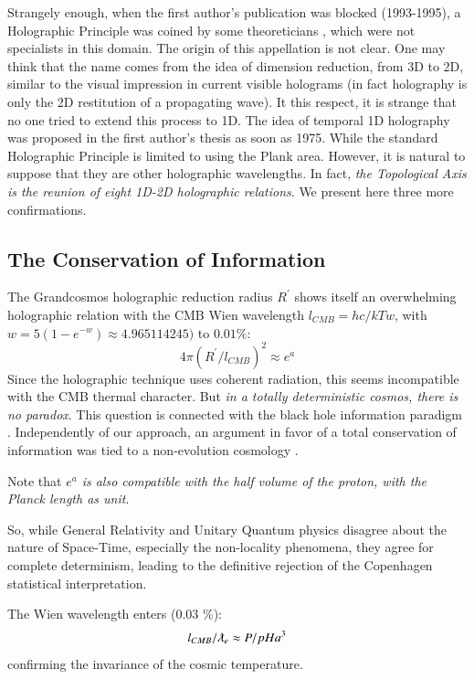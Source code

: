 \documentclass[twoside,draft]{article}
\begin{document}
\begin{sloppypar}
Strangely enough, when the first author's publication was blocked (1993-1995), a Holographic Principle was coined by some theoreticians \cite{Bousso}, which were not specialists in this domain. The origin of this appellation is not clear. One may think that the name comes from the idea of dimension reduction, from 3D to 2D, similar to the visual impression in current visible holograms (in fact holography is only the 2D restitution of a propagating wave). It this respect, it is strange that no one tried to extend this process to 1D. The idea of temporal 1D holography was proposed in the first author's thesis as soon as 1975. While the standard Holographic Principle is limited to using the Plank area. However, it is natural to suppose that they are other holographic wavelengths. In fact, \textit{the Topological Axis is the reunion of eight 1D-2D holographic relations}. We present here three more confirmations. 

\subsection{The Conservation of Information}

The Grandcosmos holographic reduction radius $R^{\prime}$ shows itself an overwhelming holographic
relation with the CMB Wien wavelength $l_{CMB} = hc/kTw $, with $w = 5 (1-e^{-w}) \approx 4.965114245)$ to $0.01\%$:
\begin{equation}
4\pi(R^{\prime}/l_{CMB})^{2} \approx e^{a}
\end{equation}
Since the holographic technique uses coherent radiation, this seems incompatible with the CMB
thermal character. But \textit{in a totally deterministic cosmos, there is no paradox}. This question is
connected with the black hole information paradigm \cite{Preskill}. Independently of our approach, an
argument in favor of a total conservation of information was tied to a non-evolution cosmology
\cite{Nikolic}. 

Note that \textit{$e^{a}$ is also compatible with the half volume of the proton, with
the Planck length as unit}.

So, while General Relativity and Unitary Quantum physics disagree about the nature of Space-Time, especially the non-locality phenomena, they agree for complete determinism, leading to the definitive rejection of the
Copenhagen statistical interpretation. 

The Wien wavelength enters (0.03 \%):
\begin{equation}
l_{CMB} / \lambdabar_e \approx P/pH a^3
\end{equation}
confirming the invariance of the cosmic temperature. 


\end{sloppypar}
\end{document}
